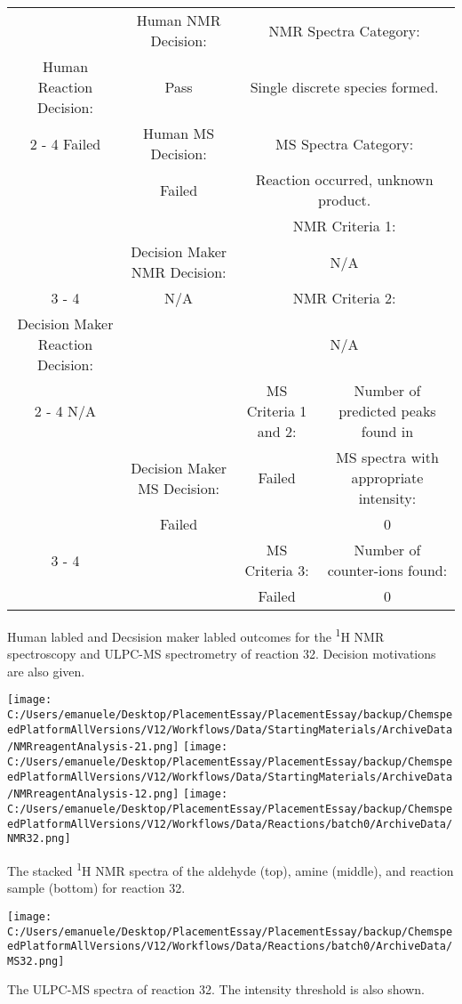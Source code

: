 \documentclass{article}%
\begin{document}
\begin{Decision Table}[H]%
\begin{tabular}{|c|c|c|c|}%
\hline%
&Human NMR Decision:&\multicolumn{2}{|c|}{NMR Spectra Category:}\\%
Human Reaction Decision:&Pass&\multicolumn{2}{|c|}{Single discrete species formed.}\\%
\cline{2%
-%
4}%
Failed&Human MS Decision:&\multicolumn{2}{|c|}{MS Spectra Category:}\\%
&Failed&\multicolumn{2}{|c|}{Reaction occurred, unknown product.}\\%
\hline%
&&\multicolumn{2}{|c|}{NMR Criteria 1:}\\%
&Decision Maker NMR Decision:&\multicolumn{2}{|c|}{N/A}\\%
\cline{3%
-%
4}%
&N/A&\multicolumn{2}{|c|}{NMR Criteria 2:}\\%
Decision Maker Reaction Decision:&&\multicolumn{2}{|c|}{N/A}\\%
\cline{2%
-%
4}%
N/A&&MS Criteria 1 and 2:&Number of predicted peaks found in\\%
&Decision Maker MS Decision:&Failed&MS spectra with appropriate intensity:\\%
&Failed&&0\\%
\cline{3%
-%
4}%
&&MS Criteria 3:&Number of counter{-}ions found:\\%
&&Failed&0\\%
\hline%
\end{tabular}%
\caption{Human labled and Decsision maker labled outcomes for the \textsuperscript{1}H NMR spectroscopy and ULPC-MS spectrometry of reaction 32. Decision motivations are also given.}%
\end{Decision Table}%
\begin{NMR Spectra}[H]%
\begin{center}%
\texttt{[image: C:/Users/emanuele/Desktop/PlacementEssay/PlacementEssay/backup/ChemspeedPlatformAllVersions/V12/Workflows/Data/StartingMaterials/ArchiveData/NMRreagentAnalysis-21.png]}\hfill%
\texttt{[image: C:/Users/emanuele/Desktop/PlacementEssay/PlacementEssay/backup/ChemspeedPlatformAllVersions/V12/Workflows/Data/StartingMaterials/ArchiveData/NMRreagentAnalysis-12.png]}\hfill%
\texttt{[image: C:/Users/emanuele/Desktop/PlacementEssay/PlacementEssay/backup/ChemspeedPlatformAllVersions/V12/Workflows/Data/Reactions/batch0/ArchiveData/NMR32.png]}\hfill%
\end{center}%
\caption{The stacked \textsuperscript{1}H NMR spectra of the aldehyde (top), amine (middle), and reaction sample (bottom) for reaction 32.}%
\end{NMR Spectra}%
\begin{MS Spectra}[H]%
\begin{center}%
\texttt{[image: C:/Users/emanuele/Desktop/PlacementEssay/PlacementEssay/backup/ChemspeedPlatformAllVersions/V12/Workflows/Data/Reactions/batch0/ArchiveData/MS32.png]}\hfill%
\end{center}%
\caption{The ULPC-MS spectra of reaction 32. The intensity threshold is also shown.}%
\end{MS Spectra}%
\end{document}
